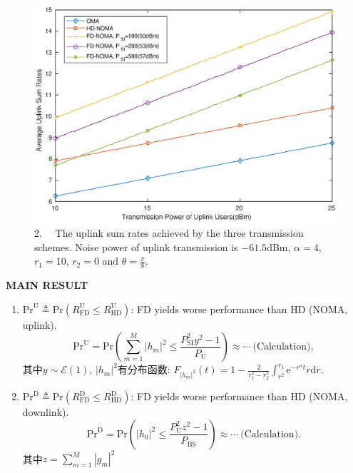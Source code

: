 \documentclass[aspectratio=169]{beamer}
\begin{document}
\begin{frame}
	\begin{figure}
		\centering
		\includegraphics[width=0.7\linewidth]{images/2.eps}
		\caption{2.$\quad$ The uplink sum rates achieved by the three transmission schemes. Noise power of uplink transmission is $-61.5$dBm, $\alpha = 4$, $r_1 = 10$, $r_2 = 0$ and $\theta = \frac{\pi}{8}$.}
		\label{fig:fig2}
	\end{figure}
\end{frame}

\begin{frame}{\textbf{{\LARGE{M}}AIN {\LARGE{R}}ESULT}}
	\begin{enumerate}
		\item \(
			\mathrm{Pr}^{\text{U}} \triangleq \mathrm{Pr}\left( R_{\text{FD}}^{\text{U}}\leqslant R_{\text{HD}}^{\text{U}}\right)
		\): FD yields worse performance than HD (NOMA, uplink).\\
		\begin{equation}
			\mathrm{Pr}^{\text{U}}  = \mathrm{Pr}\left( \sum_{m=1}^M\left\vert h_m\right\vert^2 \leqslant\frac{P^2_{\text{SI}}y^2-1}{P_{\text{U}}} \right) \approx \cdots~\text{(Calculation)},
		\end{equation}
	其中$y\sim \mathcal{E}(1)$, $\left\vert h_m\right\vert^2$有分布函数: $F_{\left\vert h_m\right\vert^2}(t) = 1- \frac{2}{r_1^2-r_2^2}\int_{r^2}^{r_1}\mathrm{e}^{-r^\alpha t}r\mathrm{d}r$.
		\item \(
		\mathrm{Pr}^{\text{D}} \triangleq \mathrm{Pr}\left( R_{\text{FD}}^{\text{D}}\leqslant R_{\text{HD}}^{\text{D}}\right)
		\): FD yields worse performance than HD (NOMA, downlink).\\
			\begin{equation}
				\mathrm{Pr}^{\text{D}} = \mathrm{Pr}\left( \left\vert h_0\right\vert^2\leqslant \frac{P_{\text{U}}^2z^2 - 1}{P_{\text{BS}}}  \right)\approx\cdots~\text{(Calculation)}.
			\end{equation}
		其中$z = \sum_{m=1}^M\left\vert g_m\right\vert^2$
	\end{enumerate}
\end{frame}
	
\end{document}
